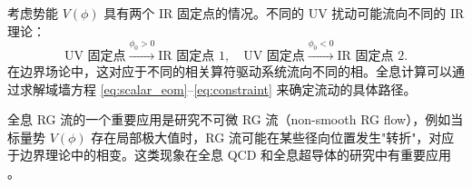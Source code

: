 \begin{example}\label{ex:multi_ir}
考虑势能 $V(\phi)$ 具有两个 IR 固定点的情况。不同的 UV 扰动可能流向不同的 IR 理论：
\begin{equation}
    \text{UV 固定点} \xrightarrow{\phi_0 > 0} \text{IR 固定点 1}, \quad
    \text{UV 固定点} \xrightarrow{\phi_0 < 0} \text{IR 固定点 2}.
\end{equation}
在边界场论中，这对应于不同的相关算符驱动系统流向不同的相。全息计算可以通过求解域墙方程 \eqref{eq:scalar_eom}--\eqref{eq:constraint} 来确定流动的具体路径。
\end{example}

\begin{remark}
全息 RG 流的一个重要应用是研究不可微 RG 流（non-smooth RG flow），例如当标量势 $V(\phi)$ 存在局部极大值时，RG 流可能在某些径向位置发生"转折"，对应于边界理论中的相变。这类现象在全息 QCD 和全息超导体的研究中有重要应用 \cite{Klebanov2011}。
\end{remark}

